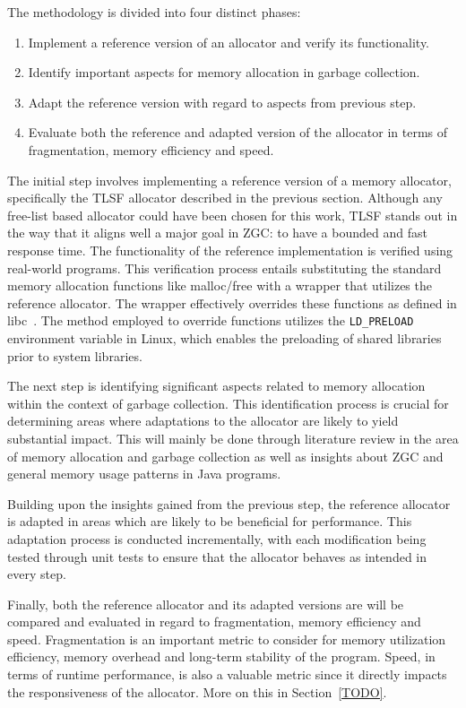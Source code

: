 
The methodology is divided into four distinct phases:

\begin{enumerate}
    \item Implement a reference version of an allocator and verify its functionality.
    \item Identify important aspects for memory allocation in garbage collection.
    \item Adapt the reference version with regard to aspects from previous step.
    \item Evaluate both the reference and adapted version of the allocator in terms of fragmentation, memory efficiency and speed.
\end{enumerate}

The initial step involves implementing a reference version of a memory allocator, specifically the TLSF allocator described in the previous section. Although any free-list based allocator could have been chosen for this work, TLSF stands out in the way that it aligns well a major goal in ZGC: to have a bounded and fast response time. The functionality of the reference implementation is verified using real-world programs. This verification process entails substituting the standard memory allocation functions like malloc/free with a wrapper that utilizes the reference allocator. The wrapper effectively overrides these functions as defined in libc~\cite{mallocman}. The method employed to override functions utilizes the \texttt{LD\_PRELOAD} environment variable in Linux, which enables the preloading of shared libraries prior to system libraries.

The next step is identifying significant aspects related to memory allocation within the context of garbage collection. This identification process is crucial for determining areas where adaptations to the allocator are likely to yield substantial impact. This will mainly be done through literature review in the area of memory allocation and garbage collection as well as insights about ZGC and general memory usage patterns in Java programs.

Building upon the insights gained from the previous step, the reference allocator is adapted in areas which are likely to be beneficial for performance. This adaptation process is conducted incrementally, with each modification being tested through unit tests to ensure that the allocator behaves as intended in every step.

Finally, both the reference allocator and its adapted versions are will be compared and evaluated in regard to fragmentation, memory efficiency and speed. Fragmentation is an important metric to consider for memory utilization efficiency, memory overhead and long-term stability of the program. Speed, in terms of runtime performance, is also a valuable metric since it directly impacts the responsiveness of the allocator. More on this in Section~\ref{TODO}.

